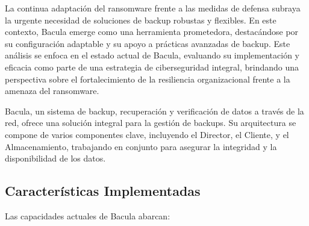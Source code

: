 La continua adaptación del ransomware frente a las medidas de defensa subraya la urgente necesidad de soluciones de backup robustas y flexibles. En este contexto, Bacula emerge como una herramienta prometedora, destacándose por su configuración adaptable y su apoyo a prácticas avanzadas de backup. Este análisis se enfoca en el estado actual de Bacula, evaluando su implementación y eficacia como parte de una estrategia de ciberseguridad integral, brindando una perspectiva sobre el fortalecimiento de la resiliencia organizacional frente a la amenaza del ransomware.\medskip

Bacula, un sistema de backup, recuperación y verificación de datos a través de la red, ofrece una solución integral para la gestión de backups. Su arquitectura se compone de varios componentes clave, incluyendo el Director, el Cliente, y el Almacenamiento, trabajando en conjunto para asegurar la integridad y la disponibilidad de los datos\autocite{bacula2023current}.

\medskip

\subsection{Características Implementadas}

\medskip
Las capacidades actuales de Bacula abarcan:

